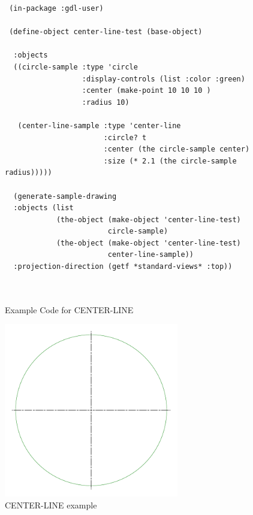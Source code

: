 \documentclass [11pt]{book}
\begin{document}
\begin{itemize}
\begin{figure}
\begin{lrbox}{\boxedverb}
\begin{minipage}{\linewidth}
{\begin{verbatim}
 (in-package :gdl-user)

 (define-object center-line-test (base-object)
 
  :objects 
  ((circle-sample :type 'circle
                  :display-controls (list :color :green)
                  :center (make-point 10 10 10 )
                  :radius 10)
   
   (center-line-sample :type 'center-line
                       :circle? t
                       :center (the circle-sample center)
                       :size (* 2.1 (the circle-sample radius)))))

  (generate-sample-drawing 
  :objects (list 
            (the-object (make-object 'center-line-test) 
                        circle-sample) 
            (the-object (make-object 'center-line-test) 
                        center-line-sample))
  :projection-direction (getf *standard-views* :top))
 
 
\end{verbatim}}
\end{minipage}
\end{lrbox}
\fbox{\usebox{\boxedverb}}

\caption{Example Code for CENTER-LINE}

\label{fig:example-code-CENTER-LINE}

\end{figure}

\begin{figure}
\begin{center}
\includegraphics[width=3in,height=3in]{../images/example-CENTER-LINE.pdf}
\end{center}

\caption{CENTER-LINE example}

\label{fig:CENTER-LINE}


\end{figure}
\end{itemize}
\end{document}
